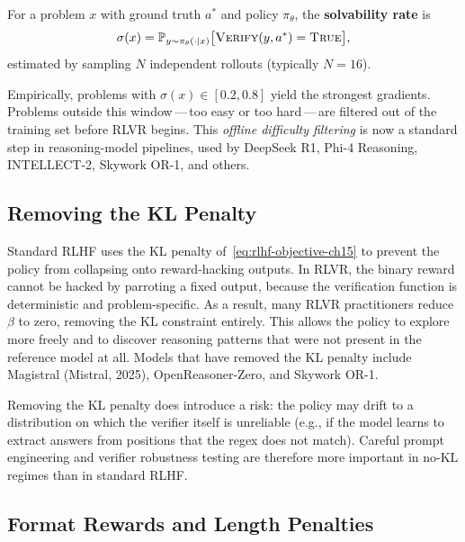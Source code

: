 \begin{definition}
\label{def:solvability}
For a problem $x$ with ground truth $a^*$ and policy $\pi_\theta$,
the \textbf{solvability rate} is
\[
\sigma(x) = \mathbb{P}_{y \sim \pi_\theta(\cdot|x)}
            \bigl[\textsc{Verify}(y, a^*) = \textsc{True}\bigr],
\]
estimated by sampling $N$ independent rollouts (typically $N = 16$).
\end{definition}

Empirically, problems with $\sigma(x) \in [0.2, 0.8]$ yield the
strongest gradients. Problems outside this window\,---\,too easy or
too hard\,---\,are filtered out of the training set before RLVR
begins. This \emph{offline difficulty filtering} is now a standard
step in reasoning-model pipelines, used by DeepSeek R1, Phi-4
Reasoning, INTELLECT-2, Skywork OR-1, and others.

\subsection{Removing the KL Penalty}
\label{subsec:no-kl}

Standard RLHF uses the KL penalty of~\eqref{eq:rlhf-objective-ch15} to
prevent the policy from collapsing onto reward-hacking outputs. In
RLVR, the binary reward cannot be hacked by parroting a fixed output,
because the verification function is deterministic and problem-specific.
As a result, many RLVR practitioners reduce $\beta$ to zero, removing
the KL constraint entirely. This allows the policy to explore more
freely and to discover reasoning patterns that were not present in
the reference model at all. Models that have removed the KL penalty
include Magistral (Mistral, 2025), OpenReasoner-Zero, and Skywork OR-1.

\begin{remark}
Removing the KL penalty does introduce a risk: the policy may drift
to a distribution on which the verifier itself is unreliable (e.g.,
if the model learns to extract answers from positions that the regex
does not match). Careful prompt engineering and verifier robustness
testing are therefore more important in no-KL regimes than in
standard RLHF.
\end{remark}

\subsection{Format Rewards and Length Penalties}
\label{subsec:format-rewards}

